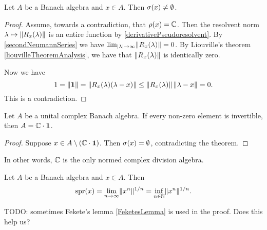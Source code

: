 \begin{proposition}
Let $A$ be a Banach algebra and $x\in A$. Then $\sigma(x)\neq \emptyset$.
\end{proposition}
\begin{proof}
Assume, towards a contradiction, that $\rho(x) = \mathbb{C}$. Then the resolvent norm $\lambda\mapsto \lVert R_x(\lambda)\rVert$ is an entire function by \ref{derivativePseudoresolvent}. By \ref{secondNeumannSeries} we have $\lim_{|\lambda|\to\infty}\lVert R_x(\lambda)\rVert = 0$. By Liouville's theorem \ref{liouvilleTheoremAnalysis}, we have that $\lVert R_x(\lambda)\rVert$ is identically zero.

Now we have
\[ 1 = \lVert\boldsymbol{\mathrm{1}}\rVert = \lVert R_x(\lambda)(\lambda-x)\rVert \leq \lVert R_x(\lambda)\rVert\,\lVert\lambda - x\rVert = 0. \]
This is a contradiction.
\end{proof}
\begin{corollary} \label{GelfandMazur}
Let $A$ be a unital complex Banach algebra. If every non-zero element is invertible, then $A=\mathbb{C}\cdot \boldsymbol{\mathrm{1}}$.
\end{corollary}
\begin{proof}
Suppose $x\in A\setminus (\mathbb{C}\cdot\boldsymbol{\mathrm{1}})$. Then $\sigma(x) = \emptyset$, contradicting the theorem.
\end{proof}
In other words, $\mathbb{C}$ is the only normed complex division algebra.


\begin{proposition} \label{spectralRadiusFormula}
Let $A$ be a Banach algebra and $x\in A$. Then
\[ \operatorname{spr}(x) = \lim_{n\to\infty}\lVert x^n\rVert^{1/n} = \inf_{n\in\mathbb{N}}\lVert x^n\rVert^{1/n}. \]
\end{proposition}
TODO: sometimes Fekete's lemma \ref{FeketesLemma} is used in the proof. Does this help us?

